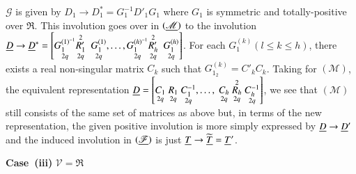 $\mathscr{G}$ is given by $D_{1}\to
D^{\ast}_{1}=G^{-1}_{1}D'_{1}G_{1}$ where $G_{1}$ is symmetric and
totally-positive over $\mathfrak{R}$. This involution goes over in
$(\underline{\mathscr{M}})$ to the involution 
$\underline{D}\to \underline{D}^{\ast} =
\left[\underset{2q}{G_{1}^{(1)^{-1}}} \underset{2q}{\overset{2}{R'_{1}}}
   \;\;  \underset{2q}{G_{1}^{(1)}},\ldots, \underset{2q}{G_{1}^{(h)^{-1}}}
  \underset{2q}{\overset{2}{R'_{h}}} \;\; \underset{2q}{G_{1}^{(h)}}\right]  
$. 
For each $G^{(k)}_{1}(l\leq k\leq h)$, there exists a real
non-singular matrix $C_{k}$ such that
$G^{(k)}_{1_{2}}=C'_{k}C_{k}$. Taking for $(\mathscr{M})$, the
equivalent representation
$\underline{D}=\left[\underset{2q}{C_{1}} \; \underset{2q}{R_{1}}
 \; \underset{2q}{C^{-1}_{1}},\ldots, \; \underset{2q}{C_{h}}
  \; \underset{2q}{\overset{2}{R_{h}}} \; \underset{2q}{C^{-1}_{h}} \right]$, 
we see that $(\mathscr{M})$ still consists of the same set of matrices
as above but, in terms of the new representation, the given positive
involution is more simply expressed by $\underline{D}\to \underline{D}'$ and the
induced involution in $(\underline{\mathscr{F}})$ is just $\underline{T}\to
\widetilde{\underline{T}}=\underline{T}'$. 

\medskip
\noindent
{\bf Case~(iii)} $\mathscr{V}=\mathfrak{R}$


